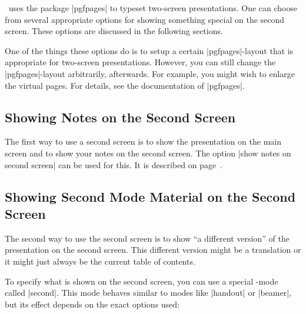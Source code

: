 \beamer\ uses the package |pgfpages| to typeset two-screen presentations. One can choose from several appropriate options for showing something special on the second screen. These options are discussed in the following sections.

One of the things these options do is to setup a certain |pgfpages|-layout that is appropriate for two-screen presentations. However, you can still change the |pgfpages|-layout arbitrarily, afterwards. For example, you might wish to enlarge the virtual pages. For details, see the documentation of |pgfpages|.

\subsection{Showing Notes on the Second Screen}

The first way to use a second screen is to show the presentation on the main screen and to show your notes on the second screen. The option |show notes on second screen| can be used for this. It is described on page~\pageref{command-notesonsecondscreen}.


\subsection{Showing Second Mode Material on the Second Screen}

The second way to use the second screen is to show ``a different version'' of the presentation on the second screen. This different version might be a translation or it might just always be the current table of contents.

To specify what is shown on the second screen, you can use a special \beamer-mode called |second|. This mode behaves similar to modes like |handout| or |beamer|, but its effect depends on the exact options used:

